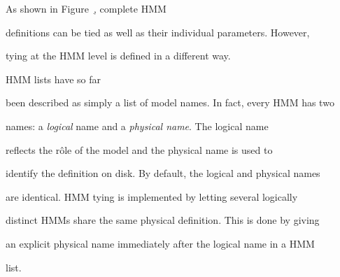 As shown in Figure~\href{f:hierarch}, complete HMM


definitions can be tied as well as their individual parameters.  However,


tying at the HMM level is defined in a different way.  


HMM lists have so far


been described as simply a list of model names. In fact, every HMM has two


names: a {\it logical} name and a {\it physical name}. The logical name


reflects the r\^{o}le of the model and the physical name is used to


identify the definition on disk.  By default, the logical and physical names


are identical.  HMM tying is implemented by letting several logically


distinct HMMs share the same physical definition.  This is done by giving


an explicit physical name immediately after the logical name in a HMM 


list.





